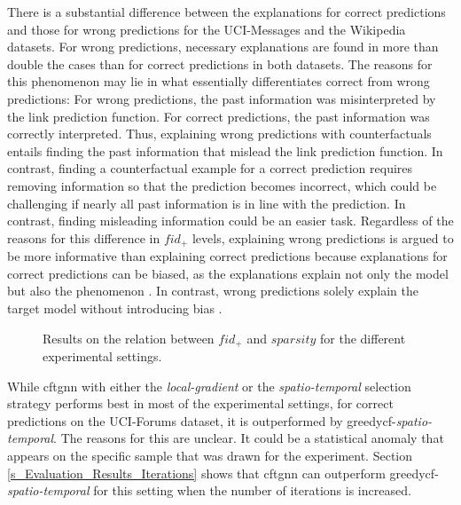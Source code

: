 There is a substantial difference between the explanations for correct predictions and those for wrong predictions for the UCI-Messages and the Wikipedia datasets.
For wrong predictions, necessary explanations are found in more than double the cases than for correct predictions in both datasets. The reasons for this phenomenon may lie in what essentially differentiates correct from wrong predictions: For wrong predictions, the past information was misinterpreted by the link prediction function. For correct predictions, the past information was correctly interpreted. Thus, explaining wrong predictions with counterfactuals entails finding the past information that mislead the link prediction function. In contrast, finding a counterfactual example for a correct prediction requires removing information so that the prediction becomes incorrect, which could be challenging if nearly all past information is in line with the prediction. In contrast, finding misleading information could be an easier task. Regardless of the reasons for this difference in $fid_+$ levels, explaining wrong predictions is argued to be more informative than explaining correct predictions because explanations for correct predictions can be biased, as the explanations explain not only the model but also the phenomenon \cite{amara_graphframex_2022}. In contrast, wrong predictions solely explain the target model without introducing bias \cite{amara_graphframex_2022}.

\begin{figure}[ht]
    \centering
    
    \caption{Results on the relation between $fid_+$ and $sparsity$ for the different experimental settings.}
    \label{f_fid_spar}
\end{figure}

While \gls{cftgnn} with either the \textit{local-gradient} or the \textit{spatio-temporal} selection strategy performs best in most of the experimental settings, for correct predictions on the UCI-Forums dataset, it is outperformed by \gls{greedycf}-\textit{spatio-temporal}. The reasons for this are unclear. It could be a statistical anomaly that appears on the specific sample that was drawn for the experiment. Section \ref{s_Evaluation_Results_Iterations} shows that \gls{cftgnn} can outperform \gls{greedycf}-\textit{spatio-temporal} for this setting when the number of iterations is increased.

